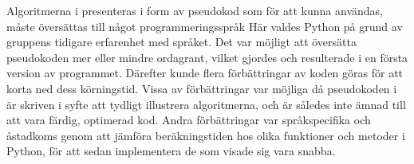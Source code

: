 

Algoritmerna i \cite{HaraldSieve} presenteras i form av pseudokod som för att kunna användas, måste översättas till något programmeringsspråk
Här valdes Python på grund av gruppens tidigare erfarenhet med språket. 
Det var möjligt att översätta pseudokoden mer eller mindre ordagrant, vilket gjordes och resulterade i en första version av programmet.
Därefter kunde flera förbättringar av koden göras för att korta ned dess körningstid. 
Vissa av förbättringar var möjliga då pseudokoden i \cite{HaraldSieve} är skriven i syfte att tydligt illustrera algoritmerna,
och är således inte ämnad till att vara färdig, optimerad kod.
Andra förbättringar var språkspecifika och åstadkoms genom att jämföra beräkningstiden hos olika funktioner och metoder i Python, för att sedan implementera de som visade sig vara snabba.



